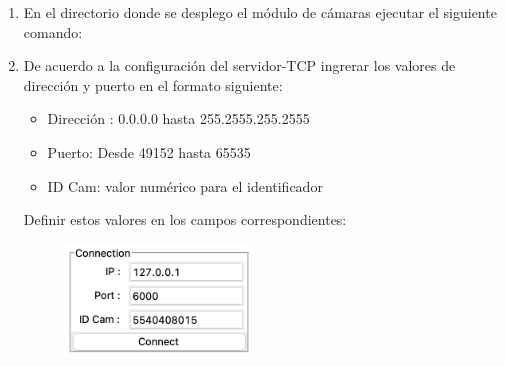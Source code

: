 \begin{enumerate}
    \item En el directorio donde se desplego el módulo de cámaras ejecutar el siguiente comando:\begin{center}
    \end{center}
    \item De acuerdo a la configuración del servidor-TCP ingrerar los valores de dirección y puerto en el formato siguiente:
    \begin{itemize}
        \item Dirección : 0.0.0.0 hasta 255.2555.255.2555
        \item Puerto: Desde 49152 hasta 65535
        \item ID Cam: valor numérico para el identificador
    \end{itemize}
    Definir estos valores en los campos correspondientes:
    \begin{figure}[H]
        \begin{center}
            \includegraphics[width=5cm]{img/anexos/ip_port.png}
        \end{center}
    \end{figure}
    

\end{enumerate}
